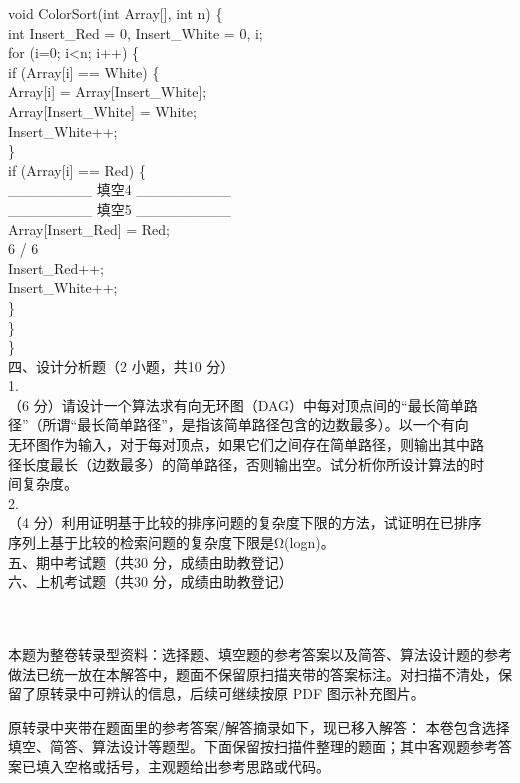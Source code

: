 \begin{question}
void ColorSort(int Array[], int n) \{\\
int Insert\_Red = 0, Insert\_White = 0, i;\\
for (i=0; i<n; i++) \{\\
if (Array[i] == White) \{\\
Array[i] = Array[Insert\_White];\\
Array[Insert\_White] = White;\\
Insert\_White++;\\
\}\\
if (Array[i] == Red) \{\\
\_\_\_\_\_\_\_\_ 填空4 \_\_\_\_\_\_\_\_\_\\
\_\_\_\_\_\_\_\_ 填空5 \_\_\_\_\_\_\_\_\_\\
Array[Insert\_Red] = Red;\\
6 / 6\\
Insert\_Red++;\\
Insert\_White++;\\
\}\\
\}\\
\}\\
四、设计分析题（2 小题，共10 分）\\
1.\\
（6 分）请设计一个算法求有向无环图（DAG）中每对顶点间的“最长简单路\\
径”（所谓“最长简单路径”，是指该简单路径包含的边数最多）。以一个有向\\
无环图作为输入，对于每对顶点，如果它们之间存在简单路径，则输出其中路\\
径长度最长（边数最多）的简单路径，否则输出空。试分析你所设计算法的时\\
间复杂度。\\
2.\\
（4 分）利用证明基于比较的排序问题的复杂度下限的方法，试证明在已排序\\
序列上基于比较的检索问题的复杂度下限是Ω(logn)。\\
五、期中考试题（共30 分，成绩由助教登记）\\
六、上机考试题（共30 分，成绩由助教登记）\\
\\
\

\begin{solution}
本题为整卷转录型资料：选择题、填空题的参考答案以及简答、算法设计题的参考做法已统一放在本解答中，题面不保留原扫描夹带的答案标注。对扫描不清处，保留了原转录中可辨认的信息，后续可继续按原 PDF 图示补充图片。

\medskip
\noindent 原转录中夹带在题面里的参考答案/解答摘录如下，现已移入解答：
本卷包含选择填空、简答、算法设计等题型。下面保留按扫描件整理的题面；其中客观题参考答案已填入空格或括号，主观题给出参考思路或代码。


\end{solution}
\end{question}

